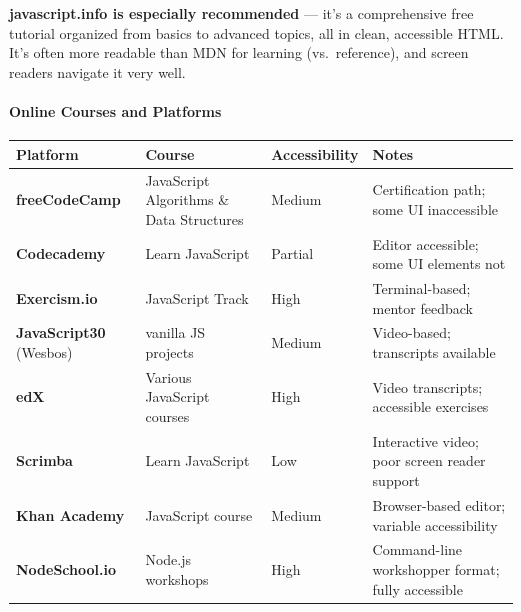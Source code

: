 \documentclass[
  justified,
  openright,
]{tufte-book}
\let\subsubsection\paragraph
\let\paragraph\paragraph
\let\subsubsection\paragraph
\let\paragraph\paragraph
\begin{document}
\textbf{javascript.info is especially recommended} --- it's a
comprehensive free tutorial organized from basics to advanced topics,
all in clean, accessible HTML. It's often more readable than MDN for
learning (vs.~reference), and screen readers navigate it very well.

\subsubsection{Online Courses and
Platforms}\label{online-courses-and-platforms}

{\def\LTcaptype{none} %
\begin{longtable}[]{@{}
  >{\raggedright\arraybackslash}p{}
  >{\raggedright\arraybackslash}p{}
  >{\raggedright\arraybackslash}p{}
  >{\raggedright\arraybackslash}p{}@{}}
\toprule\noalign{}
\begin{minipage}[b]{\linewidth}\raggedright
Platform
\end{minipage} & \begin{minipage}[b]{\linewidth}\raggedright
Course
\end{minipage} & \begin{minipage}[b]{\linewidth}\raggedright
Accessibility
\end{minipage} & \begin{minipage}[b]{\linewidth}\raggedright
Notes
\end{minipage} \\
\midrule\noalign{}
\endhead
\bottomrule\noalign{}
\endlastfoot
\textbf{freeCodeCamp} & JavaScript Algorithms \& Data Structures &
Medium & Certification path; some UI inaccessible \\
\textbf{Codecademy} & Learn JavaScript & Partial & Editor accessible;
some UI elements not \\
\textbf{Exercism.io} & JavaScript Track & High & Terminal-based; mentor
feedback \\
\textbf{JavaScript30} (Wesbos) & 30 vanilla JS projects & Medium &
Video-based; transcripts available \\
\textbf{edX} & Various JavaScript courses & High & Video transcripts;
accessible exercises \\
\textbf{Scrimba} & Learn JavaScript & Low & Interactive video; poor
screen reader support \\
\textbf{Khan Academy} & JavaScript course & Medium & Browser-based
editor; variable accessibility \\
\textbf{NodeSchool.io} & Node.js workshops & High & Command-line
workshopper format; fully accessible \\
\end{longtable}
}
\end{document}

